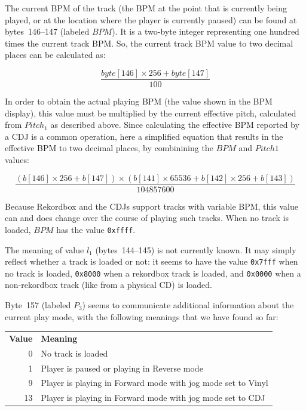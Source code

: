\documentclass[11pt]{article}
\begin{document}
The current BPM of the track (the BPM at the point that is currently
being played, or at the location where the player is currently paused)
can be found at bytes~146--147 (labeled $BPM$). It is a two-byte
integer representing one hundred times the current track BPM. So, the
current track BPM value to two decimal places can be calculated as:

\[ \frac{byte[146] \times 256 + byte[147]}{100} \]

In order to obtain the actual playing BPM (the value shown in the BPM
display), this value must be multiplied by the current effective
pitch, calculated from $Pitch_1$ as described above. Since calculating
the effective BPM reported by a CDJ is a common operation, here a
simplified equation that results in the effective BPM to two decimal
places, by combinining the $BPM$ and $Pitch1$ values:

\[ \frac{(b[146] \times 256 + b[147]) \times (b[141] \times 65536 + b[142]  \times 256 + b[143])}
     {104857600} \]

Because Rekordbox and the CDJs support tracks with variable BPM, this
value can and does change over the course of playing such tracks. When
no track is loaded, $BPM$ has the value {\tt 0xffff}.

The meaning of value $l_1$ (bytes~144--145) is not currently known. It
may simply reflect whether a track is loaded or not: it seems to have
the value {\tt 0x7fff} when no track is loaded, {\tt 0x8000} when a
rekordbox track is loaded, and {\tt 0x0000} when a non-rekordbox track
(like from a physical CD) is loaded.

Byte~157 (labeled $P_3$) seems to communicate additional information
about the current play mode, with the following meanings that we have
found so far:
\begin{center}
  \begin{tabu}{rX}
    \toprule

    \bfseries{Value} & \bfseries{Meaning} \\

    0 & No track is loaded \\

    1 & Player is paused or playing in Reverse mode \\

    9 & Player is playing in Forward mode with jog mode set to Vinyl \\

    13 & Player is playing in Forward mode with jog mode set to CDJ \\

    \bottomrule
  \end{tabu}
\end{center}
\end{document}
